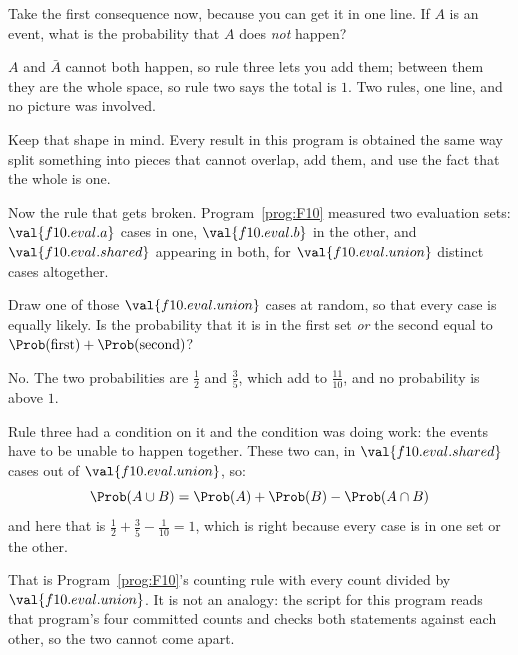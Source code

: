 \begin{fr}
Take the first consequence now, because you can get it in one line. If $A$ is
an event, what is the probability that $A$ does \emph{not} happen?
\dotline
\nextframe
\end{fr}

\begin{fr}

$A$ and $\bar{A}$ cannot both happen, so rule three lets you add them; between
them they are the whole space, so rule two says the total is $1$. Two rules,
one line, and no picture was involved.

Keep that shape in mind. Every result in this program is obtained the same way
\dash{} split something into pieces that cannot overlap, add them, and use the
fact that the whole is one.
\end{fr}

\begin{fr}
Now the rule that gets broken. Program~\ref{prog:F10} measured two evaluation
sets: $\val{f10.eval.a}$ cases in one, $\val{f10.eval.b}$ in the other, and
$\val{f10.eval.shared}$ appearing in both, for $\val{f10.eval.union}$ distinct
cases altogether.

Draw one of those $\val{f10.eval.union}$ cases at random, so that every case is
equally likely. Is the probability that it is in the first set \emph{or} the
second equal to $\Prob(\text{first}) + \Prob(\text{second})$?
\dotline
\nextframe
\end{fr}

\begin{fr}
\begin{ansblock}
No. The two probabilities are $\frac{1}{2}$ and $\frac{3}{5}$, which add to
$\frac{11}{10}$, and no probability is above $1$.
\end{ansblock}

Rule three had a condition on it and the condition was doing work: the events
have to be unable to happen together. These two can, in
$\val{f10.eval.shared}$ cases out of $\val{f10.eval.union}$, so:
\[ \Prob(A \cup B) = \Prob(A) + \Prob(B) - \Prob(A \cap B) \]
and here that is $\frac{1}{2} + \frac{3}{5} - \frac{1}{10} = 1$, which is right
because every case is in one set or the other.

That is Program~\ref{prog:F10}'s counting rule with every count divided by
$\val{f10.eval.union}$. It is not an analogy: the script for this program reads
that program's four committed counts and checks both statements against each
other, so the two cannot come apart.
\end{fr}

